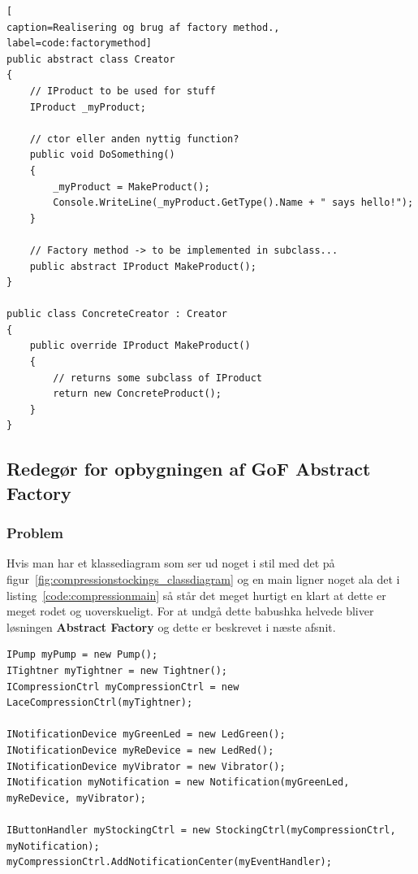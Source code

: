 \begin{lstlisting}[
caption=Realisering og brug af factory method.,
label=code:factorymethod]
public abstract class Creator
{
	// IProduct to be used for stuff
	IProduct _myProduct;
	
	// ctor eller anden nyttig function?
	public void DoSomething()
	{
		_myProduct = MakeProduct();
		Console.WriteLine(_myProduct.GetType().Name + " says hello!");
	}

	// Factory method -> to be implemented in subclass...
	public abstract IProduct MakeProduct();
}

public class ConcreteCreator : Creator
{
	public override IProduct MakeProduct()
	{
		// returns some subclass of IProduct
		return new ConcreteProduct();
	}
}
\end{lstlisting}

\subsection{Redegør for opbygningen af GoF Abstract Factory}

\subsubsection{Problem}
Hvis man har et klassediagram som ser ud noget i stil med det på figur~\ref{fig:compressionstockings_classdiagram} og en main ligner noget ala det i listing~\ref{code:compressionmain} så står det meget hurtigt en klart at dette er meget rodet og uoverskueligt. For at undgå dette babushka helvede bliver løsningen \textbf{Abstract Factory} og dette er beskrevet i næste afsnit.

\begin{lstlisting}[caption=Main for compressionstocking.application.,
label=code:compressionmain,
morekeywords={INotificationDevice,ICompressionCtrl,IButtonHandler}]
IPump myPump = new Pump();
ITightner myTightner = new Tightner();
ICompressionCtrl myCompressionCtrl = new LaceCompressionCtrl(myTightner);

INotificationDevice myGreenLed = new LedGreen();
INotificationDevice myReDevice = new LedRed();
INotificationDevice myVibrator = new Vibrator();
INotification myNotification = new Notification(myGreenLed, myReDevice, myVibrator);

IButtonHandler myStockingCtrl = new StockingCtrl(myCompressionCtrl, myNotification);
myCompressionCtrl.AddNotificationCenter(myEventHandler);
\end{lstlisting}

